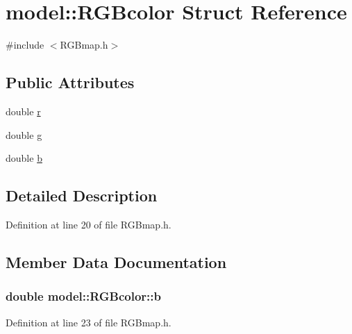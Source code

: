 \hypertarget{structmodel_1_1_r_g_bcolor}{}\section{model\+:\+:R\+G\+Bcolor Struct Reference}
\label{structmodel_1_1_r_g_bcolor}


{\ttfamily \#include $<$R\+G\+Bmap.\+h$>$}

\subsection*{Public Attributes}
\begin{DoxyCompactItemize}
\item 
double \hyperlink{structmodel_1_1_r_g_bcolor_a0d76acaf2238adbcc4c31e9a77cfa438}{r}
\item 
double \hyperlink{structmodel_1_1_r_g_bcolor_af811d23f05960ced96a790b79f6de44b}{g}
\item 
double \hyperlink{structmodel_1_1_r_g_bcolor_a68f1bea5653e5d24135bfa1fbd0ed6d1}{b}
\end{DoxyCompactItemize}


\subsection{Detailed Description}


Definition at line 20 of file R\+G\+Bmap.\+h.



\subsection{Member Data Documentation}
\hypertarget{structmodel_1_1_r_g_bcolor_a68f1bea5653e5d24135bfa1fbd0ed6d1}{}
\subsubsection[{b}]{\setlength{\rightskip}{0pt plus 5cm}double model\+::\+R\+G\+Bcolor\+::b}\label{structmodel_1_1_r_g_bcolor_a68f1bea5653e5d24135bfa1fbd0ed6d1}


Definition at line 23 of file R\+G\+Bmap.\+h.

\hypertarget{structmodel_1_1_r_g_bcolor_af811d23f05960ced96a790b79f6de44b}{}
